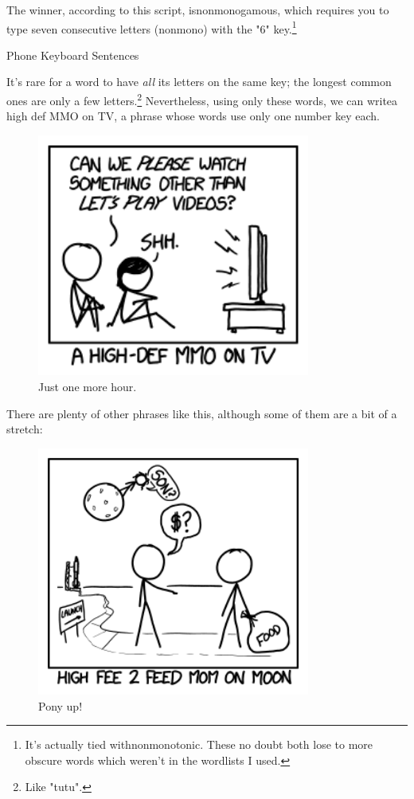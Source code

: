 {{The winner, according to this script, isnonmonogamous, which requires you to type seven consecutive letters (nonmono) with the "6" key.{\footnote{It's actually tied withnonmonotonic. These no doubt both lose to more obscure words which weren't in the wordlists I used.} } }

{Phone Keyboard Sentences}

{It's rare for a word to have \emph{all} its letters on the same key; the longest common ones are only a few letters.{\footnote{Like "tutu".} } Nevertheless, using only these words, we can writea high def MMO on TV, a phrase whose words use only one number key each.}

\begin{figure}[!htbp]
\centering
\includegraphics[scale=0.5, max width=0.8\textwidth]{imgs/a/75/t9_mmo.png}
\caption{Just one more hour.}
\end{figure}

{There are plenty of other phrases like this, although some of them are a bit of a stretch:}

\begin{figure}[!htbp]
\centering
\includegraphics[scale=0.5, max width=0.8\textwidth]{imgs/a/75/t9_mom.png}
\caption{Pony up!}
\end{figure}

}
